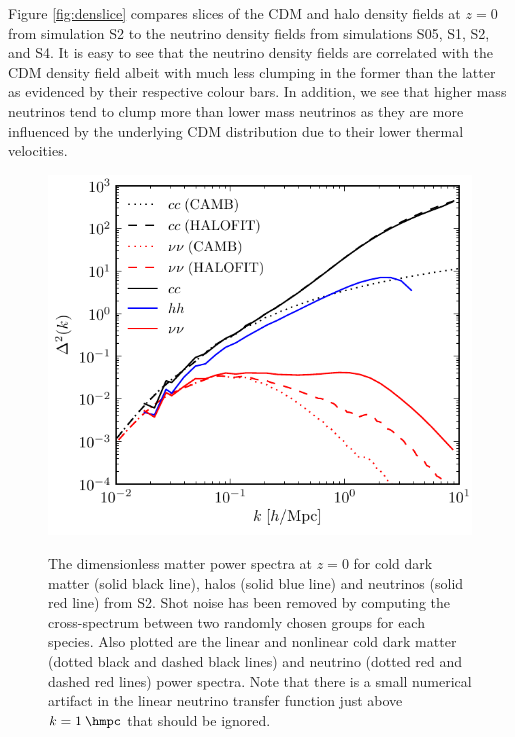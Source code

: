 Figure \ref{fig:denslice} compares slices of the CDM and halo density fields at $z = 0$ from simulation S2 to the neutrino density fields from simulations S05, S1, S2, and S4.  It is easy to see that the neutrino density fields are correlated with the CDM density field albeit with much less clumping in the former than the latter as evidenced by their respective colour bars. In addition, we see that higher mass neutrinos tend to clump more than lower mass neutrinos as they are more influenced by the underlying CDM distribution due to their lower thermal velocities.

\begin{figure}[!t]
\begin{center}
\includegraphics[width=\smwidth]{./figures/neutrinos/fig2.pdf} \vspace{-0.1cm}
\caption[Cold dark matter, neutrino, and halo density power spectra]
{The dimensionless matter power spectra at $z = 0$ for
cold dark matter (solid black line), halos (solid blue line)
and neutrinos (solid red line) from S2. Shot noise has been
removed by computing the cross-spectrum between two randomly
chosen groups for each species.  Also plotted are the linear
and nonlinear cold dark matter (dotted black and dashed
black lines) and neutrino (dotted red and dashed red lines)
power spectra. Note that there is a small numerical artifact
in the linear neutrino transfer function just above
$k = 1\:\hmpc$ that should be ignored.}
\vspace{-0.2cm}
\label{fig:denpow}
\end{center}
\end{figure}

